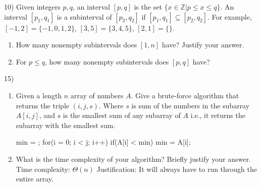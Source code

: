 \documentclass[12pt]{article}
\newenvironment{problem}[2][Problem]{\begin{trivlist}
\item[\hskip \labelsep {\bfseries #1}\hskip \labelsep {\bfseries #2.}]}{\end{trivlist}}
\begin{document}
\begin{problem}{3}(10)
Given integers $p,q$, an interval $[p,q]$ is the set $\{x \in \mathbb{Z}|p \leq x \leq q\}$. An 
interval $[p_1, q_1]$ is a subinterval of $[p_2, q_2]$ if $[p_1, q_1] \subseteq [p_2, q_2]$. For 
example, $[-1, 2] = \{-1, 0, 1, 2\}$, $[3, 5] = \{3, 4, 5\}$, $[2, 1] = \{\}$.
\begin{enumerate}
 \item How many nonempty subintervals does $[1,n]$ have? Justify your answer.
 \item For $p \leq q$, how many nonempty subintervals does $[p,q]$ have?
\end{enumerate}
\end{problem}


\begin{problem}{4}(15)

\begin{enumerate}
\item Given a length $n$ array of numbers $A$. Give a brute-force algorithm
that returns the triple $(i,j,s)$. Where $s$ is sum of the numbers in the
subarray $A[i,j]$, and $s$ is the smallest sum of any subarray of $A$ i.e.,
it returns the subarray with the smallest sum.

\begin{algorithm}[H]
\begin{algorithmic}
  \State min = \infty; \newline
        \State for(i = 0; i < j; i++){
        \State if(A[i] < min){
        \State min = A[i];
        } 
    }
\EndProcedure
\end{algorithmic}
\end{algorithm}

\item What is the time complexity of your algorithm? Briefly justify your answer.
\newline Time complexity: $ \Theta(n)$
\newline Justification: It will always have to run through the entire array.

\end{enumerate}
\end{problem}
\end{document}
